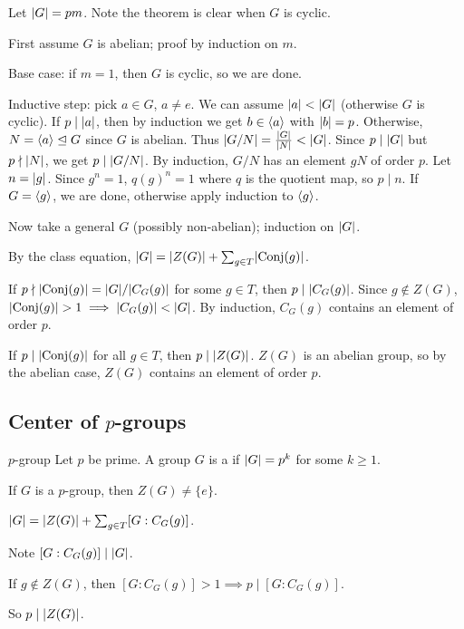 \documentclass[12pt,letterpaper]{report}
\begin{document}
\begin{thmproof}
  Let $\lvert G\rvert = pm$.
  Note the theorem is clear when $G$ is cyclic.

  First assume $G$ is abelian; proof by induction on $m$.

  Base case: if $m = 1$, then $G$ is cyclic, so we are done.

  Inductive step: pick $a \in G$, $a \neq e$.
  We can assume $\lvert a\rvert < \lvert G\rvert$ (otherwise $G$ is cyclic).
  If $p \mid \lvert a\rvert$, then by induction we get $b \in \langle a\rangle$ with $\lvert b\rvert = p$.
  Otherwise, $N = \langle a\rangle \trianglelefteq G$ since $G$ is abelian.
  Thus $\lvert G/N\rvert = \frac{\lvert G\rvert}{\lvert N\rvert} < \lvert G\rvert$.
  Since $p \mid \lvert G\rvert$ but $p \nmid \lvert N\rvert$, we get $p \mid \lvert G/N\rvert$.
  By induction, $G/N$ has an element $gN$ of order $p$.
  Let $n = \lvert g\rvert$.
  Since $g^n = 1$, $q(g)^n = 1$ where $q$ is the quotient map, so $p \mid n$.
  If $G = \langle g\rangle$, we are done, otherwise apply induction to $\langle g\rangle$.

  Now take a general $G$ (possibly non-abelian); induction on $\lvert G\rvert$.

  By the class equation, $\lvert G\rvert = \lvert Z(G)\rvert + \sum_{g \in T} \lvert\operatorname{Conj}(g)\rvert$.

  If $p \nmid \lvert\operatorname{Conj}(g)\rvert = \lvert G\rvert/\lvert C_G(g)\rvert$ for some $g \in T$, then $p \mid \lvert C_G(g)\rvert$.
  Since $g \not\in Z(G)$, $\lvert\operatorname{Conj}(g)\rvert > 1 \implies \lvert C_G(g)\rvert < \lvert G\rvert$.
  By induction, $C_G(g)$ contains an element of order $p$.

  If $p \mid \lvert\operatorname{Conj}(g)\rvert$ for all $g \in T$, then $p \mid \lvert Z(G)\rvert$.
  $Z(G)$ is an abelian group, so by the abelian case, $Z(G)$ contains an element of order $p$.
\end{thmproof}

\pagebreak
\subsection[Center of p-groups]{Center of $p$-groups}

\begin{defn}{$p$-group}{}
  Let $p$ be prime.
  A group $G$ is a  if $\lvert G\rvert = p^k$ for some $k \geq 1$.
\end{defn}

\begin{thm}{}{}
  If $G$ is a $p$-group, then $Z(G) \neq \{e\}$.
\end{thm}

\begin{thmproof}
  $\lvert G\rvert = \lvert Z(G)\rvert + \sum_{g \in T} [G : C_G(g)]$.

  Note $[G : C_G(g)] \mid \lvert G\rvert$.

  If $g \not\in Z(G)$, then $[G : C_G(g)] > 1 \implies p \mid [G : C_G(g)]$.

  So $p \mid \lvert Z(G)\rvert$.
\end{thmproof}
\end{document}
